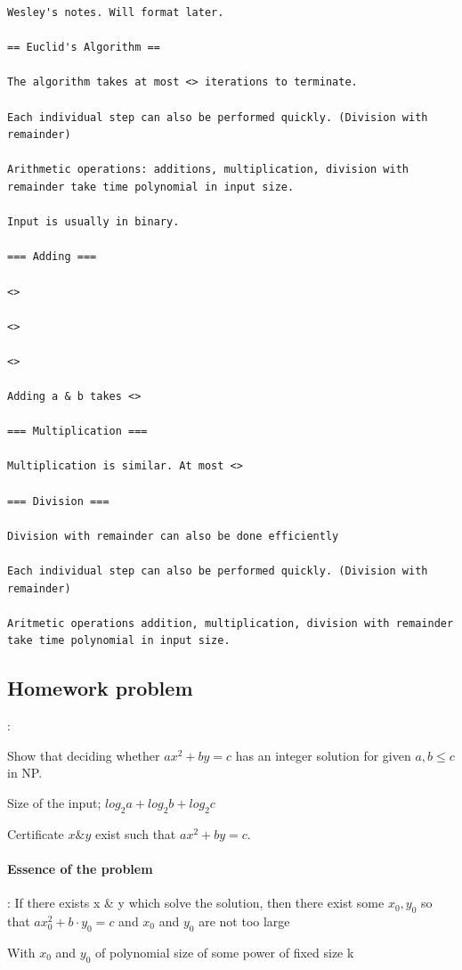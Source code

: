 \documentclass[9pt, letterpaper, oneside]{article}
\begin{document}

\begin{verbatim}
Wesley's notes. Will format later.

== Euclid's Algorithm ==

The algorithm takes at most <> iterations to terminate.

Each individual step can also be performed quickly. (Division with remainder)

Arithmetic operations: additions, multiplication, division with remainder take time polynomial in input size.

Input is usually in binary.

=== Adding ===

<>

<>

<>

Adding a & b takes <>

=== Multiplication ===

Multiplication is similar. At most <>

=== Division ===

Division with remainder can also be done efficiently

Each individual step can also be performed quickly. (Division with remainder)

Aritmetic operations addition, multiplication, division with remainder take time polynomial in input size.

\end{verbatim}


\subsection{Homework problem}:

Show that deciding whether $ax^2 + by = c$ has an integer solution for given $a, b \leq c$ in NP.

Size of the input; $log_2{a} + log_2{b} + log_2{c}$

Certificate $x \& y$ exist such that $ax^2 + by = c$.

\paragraph{Essence of the problem}: If there exists x \& y which solve the solution, then there exist some $x_0, y_0$ so that $ax_0^2 + b \cdot y_0  = c$ and $x_0$ and $y_0$ are not too large 

With $x_0$ and $y_0$ of polynomial size of some power of fixed size k
\end{document}
